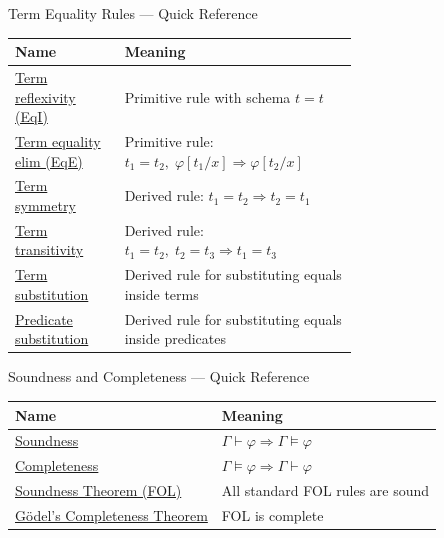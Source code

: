 

\begin{toolkitbox}{Term Equality Rules --- Quick Reference}
\small
\begin{tabular}{l p{0.68\linewidth}}
\toprule
\textbf{Name}  & \textbf{Meaning} \\
\midrule
\hyperref[def:eq-refl]{Term reflexivity (EqI)}    & Primitive rule with schema $t = t$ \\
\hyperref[def:eq-elim]{Term equality elim (EqE)}  & Primitive rule: $t_1=t_2,\;\varphi[t_1/x] \Rightarrow \varphi[t_2/x]$ \\
\hyperref[thm:eq-sym]{Term symmetry}             & Derived rule: $t_1=t_2 \Rightarrow t_2=t_1$ \\
\hyperref[thm:eq-trans]{Term transitivity}         & Derived rule: $t_1=t_2,\;t_2=t_3 \Rightarrow t_1=t_3$ \\
\hyperref[thm:eq-term]{Term substitution}    & Derived rule for substituting equals inside terms \\
\hyperref[thm:eq-pred]{Predicate substitution}  & Derived rule for substituting equals inside predicates \\
\bottomrule
\end{tabular}
\end{toolkitbox}



\begin{toolkitbox}{Soundness and Completeness --- Quick Reference}
\small
\begin{tabular}{l l}
\toprule
\textbf{Name}  & \textbf{Meaning} \\
\midrule
\hyperref[thm:fol-sound]{Soundness}     & $\Gamma \vdash \varphi \Rightarrow \Gamma \models \varphi$ \\
\hyperref[thm:godel-complete]{Completeness}  & $\Gamma \models \varphi \Rightarrow \Gamma \vdash \varphi$ \\
\hyperref[thm:fol-sound]{Soundness Theorem (FOL)}  & All standard FOL rules are sound \\
\hyperref[thm:godel-complete]{G\"{o}del's Completeness Theorem}  & FOL is complete \\
\bottomrule
\end{tabular}
\end{toolkitbox}


